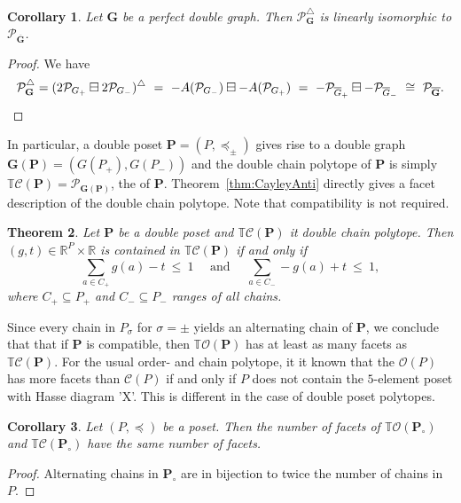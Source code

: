 \documentclass[11pt]{amsart}
\newtheorem{thm}{Theorem}[section]
\newtheorem{cor}[thm]{Corollary}
\theoremstyle{definition}
\begin{document}
\begin{cor}\label{cor:dual_doublegraph}
    Let ${\mathbf{G}}$ be a perfect double graph. Then ${\mathcal{P}}_{\mathbf{G}}^{\triangle}$ is linearly
    isomorphic to ${\mathcal{P}}_{\overline{\mathbf{G}}}$.
\end{cor}
\begin{proof}
We have
\[
    {\mathcal{P}}_{\mathbf{G}}^{\triangle}=({{{2{\mathcal{P}}_{G_+}} \boxminus {2{\mathcal{P}}_{G_-}}}})^{\triangle}  \ = \
    {{{-{A({{{\mathcal{P}}_{G_-}}})}} \boxminus {-{A({{{\mathcal{P}}_{G_+}}})}}}}  \ = \
    {{{-{\mathcal{P}}_{\overline{G}_+}} \boxminus {-{\mathcal{P}}_{\overline{G}_-}}}} \ \cong \
    {\mathcal{P}}_{\overline{\mathbf{G}}}.
    \qedhere
\]
\end{proof}

In particular, a double poset ${\mathbf{P}} = ({P},\preceq_\pm)$ gives rise to a double
graph ${\mathbf{G}}({\mathbf{P}}) = (G({P}_+),G({P}_-))$ and the double chain polytope of ${\mathbf{P}}$ is
simply ${{\mathbb{T}}{\mathcal{C}({{{\mathbf{P}}}})}}  = {\mathcal{P}}_{{\mathbf{G}}({\mathbf{P}})}$, the {\textbf{\color{black}{double chain polytope}}} of
${\mathbf{P}}$. Theorem~\ref{thm:CayleyAnti} directly gives a facet description of the
double chain polytope. Note that compatibility is not required.

\begin{thm}\label{thm:TC_facets}
    Let ${\mathbf{P}}$ be a double poset and ${{\mathbb{T}}{\mathcal{C}({{{\mathbf{P}}}})}}$ it double chain
    polytope. Then $(g,t) \in {\mathbb{R}}^{P} \times {\mathbb{R}}$ is contained in
    ${{\mathbb{T}}{\mathcal{C}({{{\mathbf{P}}}})}}$ if and only if 
    \[
        \sum_{a \in C_+} g(a) - t \ \le \ 1 \quad \text{ and } \quad \sum_{a \in
        C_-} -g(a) + t \ \le \ 1,
    \]
    where $C_+ \subseteq {P}_+$ and $C_- \subseteq {P}_-$ ranges of all chains.
\end{thm}\label{thm:TC_facets}

Since every chain in ${P}_\sigma$ for $\sigma = \pm$ yields an alternating
chain of ${\mathbf{P}}$, we conclude that that if ${\mathbf{P}}$ is compatible, then
${{\mathbb{T}}{\mathcal{O}({\mathbf{P}})}}$ has at least as many facets as ${{\mathbb{T}}{\mathcal{C}({{{\mathbf{P}}}})}}$.  For the
usual order- and chain polytope, it it known that the ${\mathcal{O}({P})}$ has more
facets than ${\mathcal{C}({P})}$ if and only if ${P}$ does not contain the $5$-element
poset with Hasse diagram 'X'. This is different in the case of double poset
polytopes.
\begin{cor}
    Let $({P},\preceq)$ be a poset. Then the number of facets of
    ${{\mathbb{T}}{\mathcal{O}({{{\mathbf{P}}_\circ}})}}$ and ${{\mathbb{T}}{\mathcal{C}({{{{\mathbf{P}}_\circ}}})}}$ have the same number of facets.
\end{cor}
\begin{proof}
    Alternating chains in ${\mathbf{P}}_\circ$ are in bijection to twice the number of
    chains in ${P}$.
\end{proof}
\end{document}
